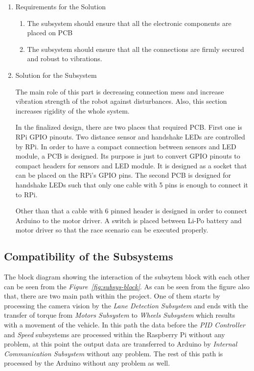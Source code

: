 \documentclass[a4paper,12pt]{article}
\begin{document}
	\begin{enumerate}
		\item {Requirements for the Solution}
		
		\begin{enumerate}
			\item The subsystem should ensure that all the electronic components are placed on PCB
			\item The subsystem should ensure that all the connections are firmly secured and robust to vibrations.
		\end{enumerate} 

	\item {Solution for the Subsystem}

		The main role of this part is decreasing connection mess and increase vibration strength of the robot against disturbances. Also, this section increases rigidity of the whole system. 
		
		In the finalized design, there are two places that required PCB. First one is RPi GPIO pinouts. Two distance sensor and handshake LEDs are controlled by RPi. In order to have a compact connection between sensors and LED module, a PCB is designed. Its purpose is just to convert GPIO pinouts to compact headers for sensors and LED module. It is designed as a socket that can be placed on the RPi's GPIO pins. The second PCB is designed for handshake LEDs such that only one cable with 5 pins is enough to connect it to RPi.  
		
		Other than that a cable with 6 pinned header is designed in order to connect Arduino to the motor driver. A switch is placed between Li-Po battery and motor driver so that the race scenario can be executed properly.




	\end{enumerate}	




\subsection{Compatibility of the Subsystems}

	The block diagram showing the interaction of the subsytem block with each other can be seen from the \textit{Figure~\ref{fig:subsys-block}}. As can be seen from the figure also that, there are two main path within the project. One of them starts by processing the camera vision by the \textit{Lane Detection Subsystem} and ends with the transfer of torque from \textit{Motors Subsystem} to \textit{Wheels Subsystem} which results with a movement of the vehicle. In this path the data before the \textit{PID Controller} and \textit{Speed} subsystems are processed within the Raspberry Pi without any problem, at this point the output data are transferred to Arduino by \textit{Internal Communication Subsystem} without any problem. The rest of this path is processed by the Arduino without any problem as well.
\end{document}
